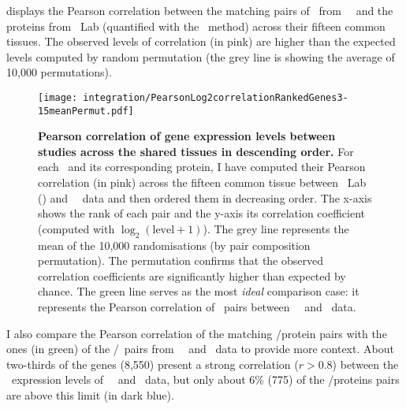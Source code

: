  displays the Pearson correlation
between the matching pairs of \mRNAs\ from \uhlen\ \etal\
and the proteins from \pandey\ Lab (quantified with the \PPKM\ method)
across their fifteen common tissues.
The observed levels of correlation (in pink) are higher
than the expected levels computed by random permutation
(the grey line is showing the average of 10,000 permutations).

\vspace{-4mm}
\begin{figure}[!htb]
    \texttt{[image: integration/PearsonLog2correlationRankedGenes3-15meanPermut.pdf]}\centering
    \vspace{-3mm}
    \caption[Pearson correlation coefficients of gene expression levels
    between studies in descending order]%
    {\label{fig:GeneProtCor}\textbf{Pearson correlation of gene expression levels
    between studies across the shared tissues in descending order.}
    For each \mRNA\ and its corresponding protein,
    I have computed their Pearson correlation (in pink)
    across the fifteen common tissue
    between \pandey\ Lab (\PPKM) and \uhlen\ \etal\ data
    and then ordered them in decreasing order.
    The x-axis shows the rank of each pair
    and the y-axis its correlation coefficient
    (computed with $\log_2(\text{level}+1)$).
    The grey line represents the mean of the 10,000 randomisations
    (by pair composition permutation).
    The permutation confirms that the observed correlation coefficients are
    significantly higher than expected by chance.
    The green line serves as the most \emph{ideal} comparison case:
    it represents the Pearson correlation of \mRNAs\ pairs
    between \uhlen\ \etal\ and \gtex\ data.
    }
    \vspace{-1em}
\end{figure}

I also compare the Pearson correlation of the matching \mRNAs/protein pairs
with the ones (in green) of the \mRNAs{}/\mRNAs\ pairs
from \uhlen\ \etal\ and \gtex\ data
to provide more context.
About two-thirds of the genes (8,550) present a strong correlation
($r>0.8$)
between the \mRNA\ expression levels of \uhlen\ \etal\ and \gtex\ data,
but only about 6\% (775) of the \mRNA/proteins pairs are above this limit
(in dark blue).

